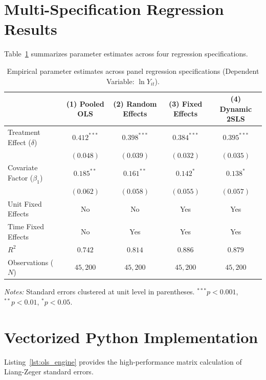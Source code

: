 \documentclass[12pt, a4paper]{article}
\begin{document}
\section{Multi-Specification Regression Results}
Table~\ref{tab:results} summarizes parameter estimates across four regression specifications.

\begin{table}[H]
    \centering
    \small
    \setlength{\tabcolsep}{4.5pt}
    \caption{Empirical parameter estimates across panel regression specifications (Dependent Variable: $\ln Y_{it}$).}
    \label{tab:results}
    \begin{tabular}{@{} l c c c c @{}}
        \toprule
        & \textbf{(1) Pooled OLS} & \textbf{(2) Random Effects} & \textbf{(3) Fixed Effects} & \textbf{(4) Dynamic 2SLS} \\
        \midrule
        Treatment Effect ($\delta$) & $0.412^{***}$ & $0.398^{***}$ & $0.384^{***}$ & $0.395^{***}$ \\
                                    & $(0.048)$     & $(0.039)$     & $(0.032)$     & $(0.035)$     \\
        Covariate Factor ($\beta_1$)& $0.185^{**}$  & $0.161^{**}$  & $0.142^{*}$   & $0.138^{*}$   \\
                                    & $(0.062)$     & $(0.058)$     & $(0.055)$     & $(0.057)$     \\
        \midrule
        Unit Fixed Effects          & No            & No            & Yes           & Yes           \\
        Time Fixed Effects          & No            & Yes           & Yes           & Yes           \\
        $R^2$                       & $0.742$       & $0.814$       & $0.886$       & $0.879$       \\
        Observations ($N$)          & $45{,}200$    & $45{,}200$    & $45{,}200$    & $45{,}200$    \\
        \bottomrule
    \end{tabular}
    \vspace{0.15cm}
    \par{\footnotesize \textit{Notes:} Standard errors clustered at unit level in parentheses. $^{***}p<0.001$, $^{**}p<0.01$, $^{*}p<0.05$.}
\end{table}

\section{Vectorized Python Implementation}
Listing~\ref{lst:ols_engine} provides the high-performance matrix calculation of Liang-Zeger standard errors.
\end{document}
